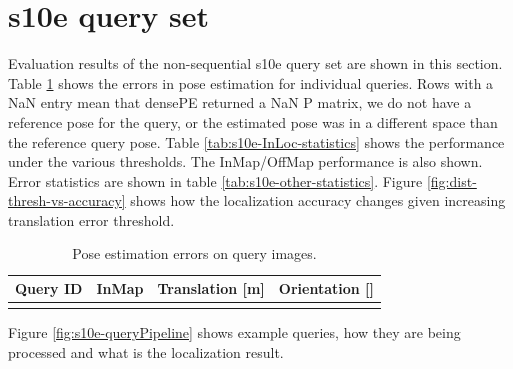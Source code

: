\documentclass[twoside]{ctuthesis}
\theoremstyle{plain}
\theoremstyle{definition}
\theoremstyle{note}
\begin{document}
\section{s10e query set}
Evaluation results of the non-sequential s10e query set are shown in this section. Table \ref{tab:estimation-errors} shows the errors in pose estimation for individual queries. Rows with a NaN entry mean that densePE returned a NaN P matrix, we do not have a reference pose for the query, or the estimated pose was in a different space than the reference query pose. Table \ref{tab:s10e-InLoc-statistics} shows the performance under the various thresholds. The InMap/OffMap performance is also shown. Error statistics are shown in table \ref{tab:s10e-other-statistics}. Figure \ref{fig:dist-thresh-vs-accuracy} shows how the localization accuracy changes given increasing translation error threshold.

\begin{table}[htb!]
	\centering
	\begin{tabular}{|c|c|c|c|}
		\hline
		\bfseries Query ID & \bfseries InMap & \bfseries Translation [m] & \bfseries Orientation [\degree]
		\csvreader[head to column names]{evaluation-s10e/errors.csv}{}
		{\\ \hline \id & \inMap & \translation & \orientation}
		\\\hline
	\end{tabular}
	\caption{Pose estimation errors on query images.}
	\label{tab:estimation-errors}
\end{table}

Figure \ref{fig:s10e-queryPipeline} shows example queries, how they are being processed and what is the localization result.
\end{document}
